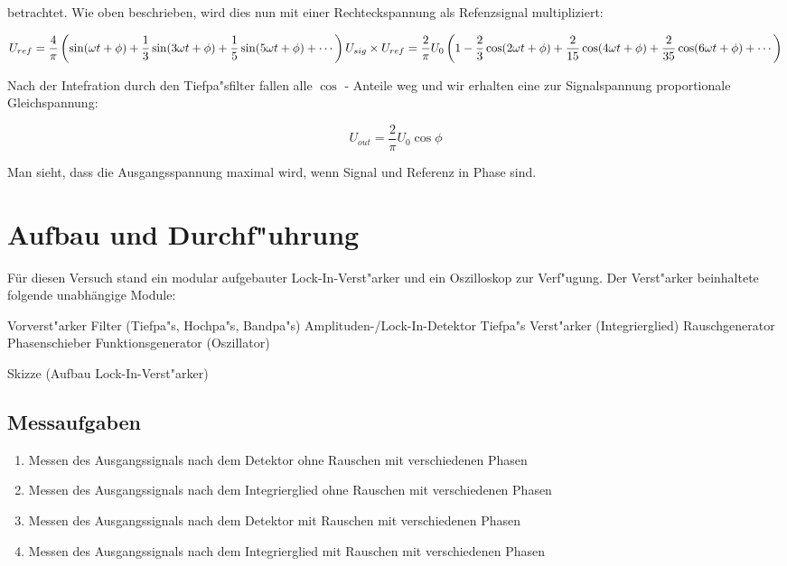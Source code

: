 \documentclass{scrartcl}
\begin{document}
betrachtet. Wie oben beschrieben, wird dies nun mit einer Rechteckspannung als Refenzsignal multipliziert:

\begin{displaymath}
	U_{ref} = \frac{4}{\pi} 
		\left(\sin(\omega t + \phi) + 
			\frac{1}{3} \sin(3 \omega t + \phi) + 
			\frac{1}{5} \sin(5 \omega t + \phi) + 
			\cdots 
		\right) \\

	U_{sig} \times U_{ref} = \frac{2}{\pi} U_0 
	\left(
		1 - 
		\frac{2}{3}\cos(2 \omega t + \phi) + 
		\frac{2}{15} \cos(4 \omega t + \phi) + 
		\frac{2}{35} \cos(6 \omega t + \phi) + 
		\cdots 
	\right)
\end{displaymath}

Nach der Intefration durch den Tiefpa"sfilter fallen alle $\cos$ - Anteile weg und wir erhalten eine zur Signalspannung proportionale Gleichspannung:

\begin{equation}
	U_{out} = \frac{2}{\pi} U_0 \cos{\phi}
\end{equation}

Man sieht, dass die Ausgangsspannung maximal wird, wenn Signal und Referenz in Phase sind.
 

\section{Aufbau und Durchf"uhrung}

Für diesen Versuch stand ein modular aufgebauter Lock-In-Verst"arker und ein Oszilloskop zur Verf"ugung.
Der Verst"arker beinhaltete folgende unabhängige Module:

Vorverst"arker
Filter (Tiefpa"s, Hochpa"s, Bandpa"s)
Amplituden-/Lock-In-Detektor
Tiefpa"s Verst"arker (Integrierglied)
Rauschgenerator
Phasenschieber
Funktionsgenerator (Oszillator)

Skizze (Aufbau Lock-In-Verst"arker)

\subsection{Messaufgaben}

\begin{enumerate}
\item \label{a1} Messen des Ausgangssignals nach dem Detektor ohne Rauschen mit verschiedenen Phasen
\item \label{a2} Messen des Ausgangssignals nach dem Integrierglied ohne Rauschen mit verschiedenen Phasen
\item \label{a3} Messen des Ausgangssignals nach dem Detektor mit Rauschen mit verschiedenen Phasen
\item \label{a4} Messen des Ausgangssignals nach dem Integrierglied mit Rauschen mit verschiedenen Phasen
\end{enumerate}
\end{document}
